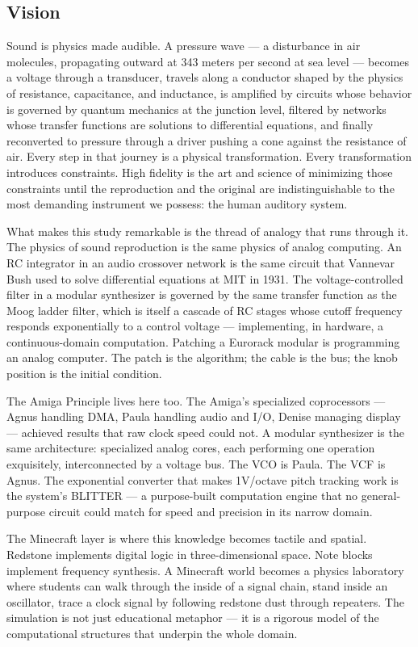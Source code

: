 \documentclass[11pt,letterpaper]{article}
\begin{document}
\subsection{Vision}

Sound is physics made audible. A pressure wave --- a disturbance in air molecules, propagating outward at 343 meters per second at sea level --- becomes a voltage through a transducer, travels along a conductor shaped by the physics of resistance, capacitance, and inductance, is amplified by circuits whose behavior is governed by quantum mechanics at the junction level, filtered by networks whose transfer functions are solutions to differential equations, and finally reconverted to pressure through a driver pushing a cone against the resistance of air. Every step in that journey is a physical transformation. Every transformation introduces constraints. High fidelity is the art and science of minimizing those constraints until the reproduction and the original are indistinguishable to the most demanding instrument we possess: the human auditory system.

What makes this study remarkable is the thread of analogy that runs through it. The physics of sound reproduction is the same physics of analog computing. An RC integrator in an audio crossover network is the same circuit that Vannevar Bush used to solve differential equations at MIT in 1931. The voltage-controlled filter in a modular synthesizer is governed by the same transfer function as the Moog ladder filter, which is itself a cascade of RC stages whose cutoff frequency responds exponentially to a control voltage --- implementing, in hardware, a continuous-domain computation. Patching a Eurorack modular is programming an analog computer. The patch is the algorithm; the cable is the bus; the knob position is the initial condition.

The Amiga Principle lives here too. The Amiga's specialized coprocessors --- Agnus handling DMA, Paula handling audio and I/O, Denise managing display --- achieved results that raw clock speed could not. A modular synthesizer is the same architecture: specialized analog cores, each performing one operation exquisitely, interconnected by a voltage bus. The VCO is Paula. The VCF is Agnus. The exponential converter that makes 1V/octave pitch tracking work is the system's BLITTER --- a purpose-built computation engine that no general-purpose circuit could match for speed and precision in its narrow domain.

The Minecraft layer is where this knowledge becomes tactile and spatial. Redstone implements digital logic in three-dimensional space. Note blocks implement frequency synthesis. A Minecraft world becomes a physics laboratory where students can walk through the inside of a signal chain, stand inside an oscillator, trace a clock signal by following redstone dust through repeaters. The simulation is not just educational metaphor --- it is a rigorous model of the computational structures that underpin the whole domain.
\end{document}
